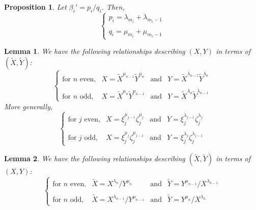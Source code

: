 \documentclass[10pt,a4paper]{amsart}
\newtheorem{prop}{Proposition}
\newtheorem{lem}{Lemma}
\begin{document}
\begin{prop} \label{pq}
Let $\beta_i'=p_i/q_i$. Then,
\begin{equation*}
\left\{
\begin{array}{l}
p_i=\lambda_{m_i} + \lambda_{m_i-1}
\\\\
q_i=\mu_{m_i} + \mu_{m_i-1}
\end{array}
\right.
\end{equation*}
\end{prop}

\begin{lem} \label{XY}
We have the following relationships describing $\left(X,Y\right)$ in terms of $\left(\tilde X,\tilde Y\right)$:
\begin{equation*}
\left\{
\begin{array}{llll}
\text{for } n \text{ even,} & X = \tilde X^{\mu_{n-1}} \tilde Y^{\mu_n}  & \text{and} & Y = \tilde X^{\lambda_{n-1}} \tilde Y^{\lambda_n}
\\\\
\text{for } n \text{ odd,} & X = \tilde X^{\mu_n} \tilde Y^{\mu_{n-1}}  & \text{and} & Y= \tilde X^{\lambda_n} \tilde Y^{\lambda_{n-1}}
\end{array}
\right.
\end{equation*}
More generally,
\begin{equation*}
\left\{
\begin{array}{llll}
\text{for } j \text{ even,} & X = \xi_j^{\mu_{j-1}} \zeta_j^{\mu_j}  & \text{and} & Y = \xi_j^{\lambda_{j-1}} \zeta_j^{\lambda_j}
\\\\
\text{for } j \text{ odd,} & X = \xi_j^{\mu_j} \zeta_j^{\mu_{j-1}}  & \text{and} & Y= \xi_j^{\lambda_j} \zeta_j^{\lambda_{j-1}}
\end{array}
\right.
\end{equation*}
\end{lem}

\begin{lem} \label{XYtilde}
We have the following relationships describing $\left(\tilde X,\tilde Y\right)$ in terms of $\left(X,Y\right)$:
\begin{equation*}
\left\{
\begin{array}{llll}
\text{for } n \text{ even,} & \tilde X = X^{\lambda_n}/Y^{\mu_n} & \text{and} & \tilde Y = Y^{\mu_{n-1}}/X^{\lambda_{n-1}}
\\\\
\text{for } n \text{ odd,} & \tilde X = X^{\lambda_{n-1}}/Y^{\mu_{n-1}} & \text{and} & \tilde Y = Y^{\mu_n}/X^{\lambda_n}
\end{array}
\right.
\end{equation*}
\end{lem}
\end{document}
